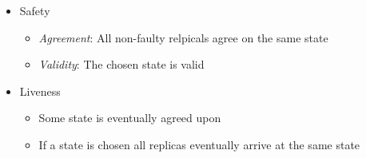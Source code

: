 \documentclass{easyclass}
\begin{document}
\begin{prf}[Properties]{}
    \begin{itemize}
        \item Safety
        \begin{itemize}
            \item \emph{Agreement}: All non-faulty relpicals agree on the same state
            \item \emph{Validity}: The chosen state is valid
        \end{itemize}
        \item Liveness
         \begin{itemize}
            \item Some state is eventually agreed upon
            \item If a state is chosen all replicas eventually arrive at the same state
        \end{itemize}
    \end{itemize}
\end{prf}
\end{document}
